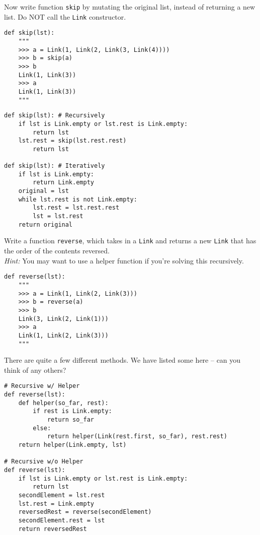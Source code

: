 \documentclass{exam}
\begin{document}
\begin{questions}

\begin{blocksection}
\question Now write function \texttt{skip} by mutating the original list, instead of returning a new list. Do NOT call the \texttt{Link} constructor.

\begin{lstlisting}
def skip(lst):
    """
    >>> a = Link(1, Link(2, Link(3, Link(4))))
    >>> b = skip(a)
    >>> b
    Link(1, Link(3))
    >>> a
    Link(1, Link(3))
    """
\end{lstlisting}

\begin{solution}[1in]
\begin{lstlisting}
def skip(lst): # Recursively
    if lst is Link.empty or lst.rest is Link.empty:
        return lst
    lst.rest = skip(lst.rest.rest)
        return lst

def skip(lst): # Iteratively
    if lst is Link.empty:
        return Link.empty
    original = lst
    while lst.rest is not Link.empty:
        lst.rest = lst.rest.rest
        lst = lst.rest
    return original
\end{lstlisting}
\end{solution}

\end{blocksection}

\begin{blocksection}
\question Write a function \texttt{reverse}, which takes in a \texttt{Link} and
returns a new \texttt{Link} that has the order of the contents reversed.\\
\emph{Hint:} You may want to use a helper function if you're solving this
recursively.
\begin{lstlisting}
def reverse(lst):
    """
    >>> a = Link(1, Link(2, Link(3)))
    >>> b = reverse(a)
    >>> b
    Link(3, Link(2, Link(1)))
    >>> a
    Link(1, Link(2, Link(3)))
    """
\end{lstlisting}

\begin{solution}[1in]
There are quite a few different methods. We have listed some here -- can you
think of any others?
\begin{lstlisting}
# Recursive w/ Helper
def reverse(lst):
    def helper(so_far, rest):
        if rest is Link.empty:
            return so_far
        else:
            return helper(Link(rest.first, so_far), rest.rest)
    return helper(Link.empty, lst)

# Recursive w/o Helper
def reverse(lst):
    if lst is Link.empty or lst.rest is Link.empty:
        return lst
    secondElement = lst.rest
    lst.rest = Link.empty
    reversedRest = reverse(secondElement)
    secondElement.rest = lst
    return reversedRest


\end{lstlisting}
\end{solution}
\end{blocksection}
\end{questions}
\end{document}
